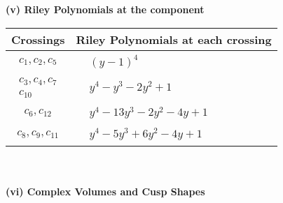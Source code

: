 \documentclass[1p]{elsarticle_modified}
\theoremstyle{definition}
\begin{document}
\newpage\renewcommand{\arraystretch}{1}
\flushleft \textbf{(v) Riley Polynomials at the component}\newline \\
\begin{tabular}{m{50pt}|m{274pt}}
Crossings & \hspace{64pt}Riley Polynomials at each crossing \\
\hline $$\begin{aligned}c_{1},c_{2},c_{5}\end{aligned}$$&$\begin{aligned}
&(y-1)^4
\end{aligned}$\\
\hline $$\begin{aligned}c_{3},c_{4},c_{7}\\c_{10}\end{aligned}$$&$\begin{aligned}
&y^4- y^3-2 y^2+1
\end{aligned}$\\
\hline $$\begin{aligned}c_{6},c_{12}\end{aligned}$$&$\begin{aligned}
&y^4-13 y^3-2 y^2-4 y+1
\end{aligned}$\\
\hline $$\begin{aligned}c_{8},c_{9},c_{11}\end{aligned}$$&$\begin{aligned}
&y^4-5 y^3+6 y^2-4 y+1
\end{aligned}$\\
\hline
\end{tabular}\\~\\
\newpage\flushleft \textbf{(vi) Complex Volumes and Cusp Shapes}
\end{document}
